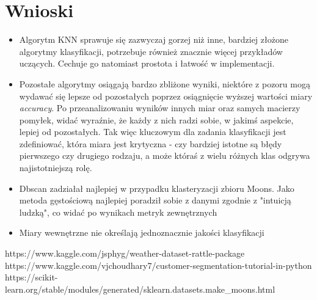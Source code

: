 \documentclass{classrep}
\begin{document}
    \section{Wnioski}
    \label{conclusions} {
        \begin{itemize}
            \item Algorytm KNN sprawuje się zazwyczaj gorzej niż inne, bardziej złożone algorytmy klasyfikacji, potrzebuje również znacznie więcej przykładów uczących. Cechuje go natomiast prostota i łatwość w implementacji.
            \item Pozostałe algorytmy osiągają bardzo zbliżone wyniki, niektóre z pozoru mogą wydawać się lepsze od pozostałych poprzez osiągnięcie wyższej wartości miary \emph{accuracy}. Po przeanalizowaniu wyników innych miar oraz samych macierzy pomyłek, widać wyraźnie, że każdy z nich radzi sobie, w jakimś aspekcie, lepiej od pozostałych. Tak więc kluczowym dla zadania klasyfikacji jest zdefiniować, która miara jest krytyczna - czy bardziej istotne są błędy pierwszego czy drugiego rodzaju, a może któraś z wielu różnych klas odgrywa najistotniejszą rolę.
            \item Dbscan zadziałał najlepiej w przypadku klasteryzacji zbioru Moons. Jako metoda gęstościową najlepiej poradził sobie z danymi zgodnie z "intuicją ludzką", co widać po wynikach metryk zewnętrznych
            \item Miary wewnętrzne nie określają jednoznacznie jakości klasyfikacji
        \end{itemize}
    }

    \begin{thebibliography}{0}
        {https://www.kaggle.com/jsphyg/weather-dataset-rattle-package}
        {https://www.kaggle.com/vjchoudhary7/customer-segmentation-tutorial-in-python}
        {https://scikit-learn.org/stable/modules/generated/sklearn.datasets.make\_moons.html}
    \end{thebibliography}
\end{document}
